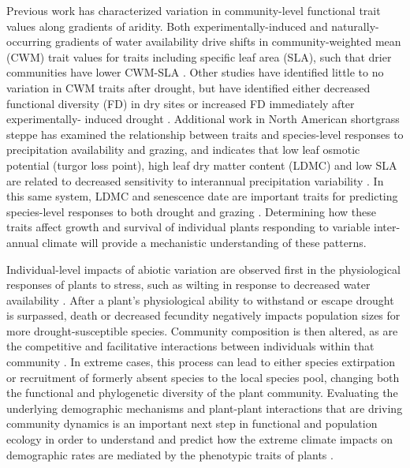 \documentclass[12pt, letterpaper]{article}
\begin{document}
Previous work has characterized variation in community-level functional trait values along gradients of aridity. Both experimentally-induced and naturally-occurring gradients of water availability drive shifts in community-weighted mean (CWM) trait values for traits including specific leaf area (SLA), such that drier communities have lower CWM-SLA \citep{Nunes2017WhichDrylands,Cornwell2009CommunityCalifornia}. Other studies have identified little to no variation in CWM traits after drought, but have identified either decreased functional diversity (FD) in dry sites \citep{Luo2019LongGrasslands} or increased FD immediately after experimentally- induced drought \citep{Griffin-Nolan2019}. Additional work in North American shortgrass steppe has examined the relationship between traits and species-level responses to precipitation availability and grazing, and indicates that low leaf osmotic potential (turgor loss point), high leaf dry matter content (LDMC) and low SLA are related to decreased sensitivity to interannual precipitation variability \citep{Wilcox2020PlantPrairie}. In this same system, LDMC and senescence date are important traits for predicting species-level responses to both drought and grazing \citep{Blumenthal2020}. Determining how these traits affect growth and survival of individual plants responding to variable inter-annual climate will provide a mechanistic understanding of these patterns.

Individual-level impacts of abiotic variation are observed first in the physiological responses of plants to stress, such as wilting in response to decreased water availability \citep{Bartlett2012}. After a plant's physiological ability to withstand or escape drought is surpassed, death or decreased fecundity negatively impacts population sizes for more drought-susceptible species. Community composition is then altered, as are the competitive and facilitative interactions between individuals within that community \citep{Ploughe2019CommunityInteractions}. In extreme cases, this process can lead to either species extirpation or recruitment of formerly absent species to the local species pool, changing both the functional and phylogenetic diversity of the plant community.  Evaluating the underlying demographic mechanisms and plant-plant interactions that are driving community dynamics is an important next step in functional and population ecology in order to understand and predict how the extreme climate impacts on demographic rates are mediated by the phenotypic traits of plants \citep{Laughlin2020TheFitness,Ploughe2019CommunityInteractions,Hoover2014ResistanceExtremes,Salguero-Gomez2012}.   
\end{document}
